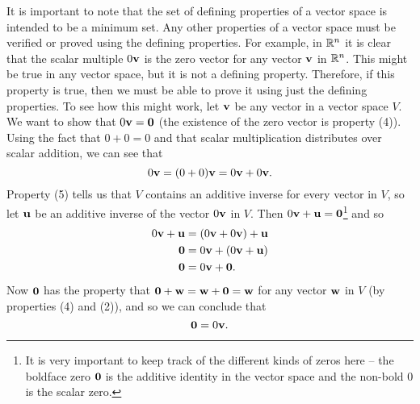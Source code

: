 It is important to note that the set of defining properties of a vector space is intended to be a minimum set. Any other properties of a vector space must be verified or proved using the defining properties. For example, in $\mathbb{R}^n$ it is clear that the scalar multiple $0\mathbf{v}$ is the zero vector for any vector $\mathbf{v}$ in $\mathbb{R}^n$. This might be true in any vector space, but it is not a defining property. Therefore, if this property is true, then we must be able to prove it using just the defining properties. To see how this might work, let $\mathbf{v}$ be any vector in a vector space $V$. We want to show that $0 \mathbf{v} = \mathbf{0}$ (the existence of the zero vector is property (4)). Using the fact that $0+0 = 0$ and that scalar multiplication distributes over scalar addition, we can see that 
\[0\mathbf{v} = (0+0)\mathbf{v} = 0\mathbf{v} + 0\mathbf{v}.\]
Property (5) tells us that $V$ contains an additive inverse for every vector in $V$, so let $\mathbf{u}$ be an additive inverse of the vector $0\mathbf{v}$ in $V$. Then $0\mathbf{v} + \mathbf{u} = \mathbf{0}$\footnote{It is very important to keep track of the different kinds of zeros here -- the boldface zero $\mathbf{0}$ is the additive identity in the vector space and the non-bold 0 is the scalar zero.} and so
\begin{align*}
0\mathbf{v} + \mathbf{u} &= (0\mathbf{v} + 0\mathbf{v}) + \mathbf{u} \\
\mathbf{0} &= 0\mathbf{v} + (0\mathbf{v} + \mathbf{u}) \\
\mathbf{0} &= 0\mathbf{v} + \mathbf{0}.
\end{align*}
Now $\mathbf{0}$ has the property that $\mathbf{0} + \mathbf{w} = \mathbf{w}+ \mathbf{0} = \mathbf{w}$ for any vector $\mathbf{w}$ in $V$ (by properties (4) and (2)), and so we can conclude that 
\[\mathbf{0} = 0\mathbf{v}.\]


